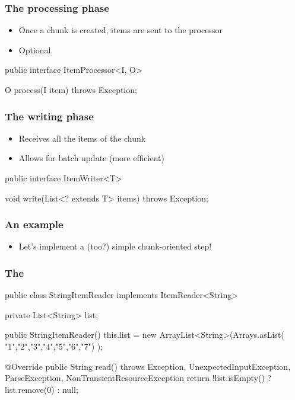 \begin{frame}[fragile]
\frametitle{The processing phase}
\begin{itemize}
 \item Once a chunk is created, items are sent to the processor
 \item Optional
\end{itemize}

\begin{javacode}
public interface ItemProcessor<I, O> {

  O process(I item) throws Exception;

}
\end{javacode}
\end{frame}

\begin{frame}[fragile]
\frametitle{The writing phase}
\begin{itemize}
 \item Receives all the items of the chunk
 \item Allows for batch update (more efficient)
\end{itemize}

\begin{javacode}
public interface ItemWriter<T> {

  void write(List<? extends T> items) throws Exception;

}
\end{javacode}
\end{frame}

\begin{frame}
 \frametitle{An example}
 \begin{itemize}
  \item Let's implement a (too?) simple chunk-oriented step!  
 \end{itemize}
\end{frame}

\begin{frame}[fragile]
\frametitle{The }
\begin{javacode}
public class StringItemReader implements ItemReader<String> {

  private List<String> list;

  public StringItemReader() {
    this.list = new ArrayList<String>(Arrays.asList(
      "1","2","3","4","5","6","7")
    );
  }

  @Override
  public String read() throws Exception, UnexpectedInputException,
                         ParseException, NonTransientResourceException {
    return !list.isEmpty() ? list.remove(0) : null;
  }
}
\end{javacode}
\end{frame}


